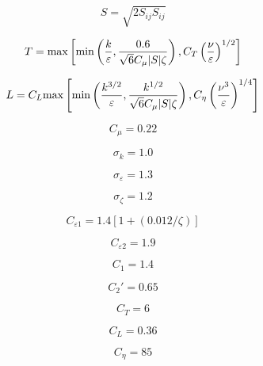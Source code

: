 \begin{equation}
S=\sqrt{2 S_{ij} S_{ij}}
\end{equation}

\begin{equation}
T = {\rm max} \left[ {\rm min} \left(
\frac{k}{\varepsilon}, \frac{0.6}{\sqrt{6} C_{\mu} |S| \zeta} \right),
C_T \left( \frac{\nu}{\varepsilon} \right)^{1/2} \right]
\end{equation}

\begin{equation}
L = C_L {\rm max} \left[ {\rm min} \left(
\frac{k^{3/2}}{\varepsilon},
\frac{k^{1/2}}{\sqrt{6} C_{\mu} |S| \zeta} \right),
C_{\eta} \left( \frac{\nu^3}{\varepsilon} \right)^{1/4} \right]
\end{equation}

\begin{equation}
C_{\mu} = 0.22
\end{equation}

\begin{equation}
\sigma_k = 1.0
\end{equation}

\begin{equation}
\sigma_{\varepsilon} = 1.3
\end{equation}

\begin{equation}
\sigma_{\zeta} = 1.2
\end{equation}

\begin{equation}
C_{\varepsilon 1} = 1.4[1+(0.012/\zeta)]
\end{equation}

\begin{equation}
C_{\varepsilon 2} = 1.9
\end{equation}

\begin{equation}
C_1 = 1.4
\end{equation}

\begin{equation}
C_2' = 0.65
\end{equation}

\begin{equation}
C_T = 6
\end{equation}

\begin{equation}
C_L = 0.36
\end{equation}

\begin{equation}
C_{\eta} = 85
\end{equation}

